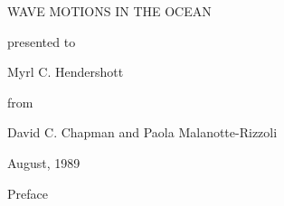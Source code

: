 
\NewDocumentCommand{\sourceblankpage}{}{\thispagestyle{empty}\null\clearpage}

\thispagestyle{empty}
\begin{center}
	\vspace*{1.45in}
	{\LARGE WAVE MOTIONS IN THE OCEAN\par}
	\vspace{1.28in}
	{\small presented to\par}
	\vspace{0.34in}
	{\Large Myrl C. Hendershott\par}
	\vspace{1.18in}
	{\small from\par}
	\vspace{0.30in}
	{\normalsize David C. Chapman and Paola Malanotte-Rizzoli\par}
	\vfill
	{\normalsize August, 1989\par}
	\vspace{0.90in}
\end{center}
\clearpage

\sourceblankpage

\thispagestyle{empty}
\vspace*{0.46in}
\begin{center}{\large Preface}\end{center}

